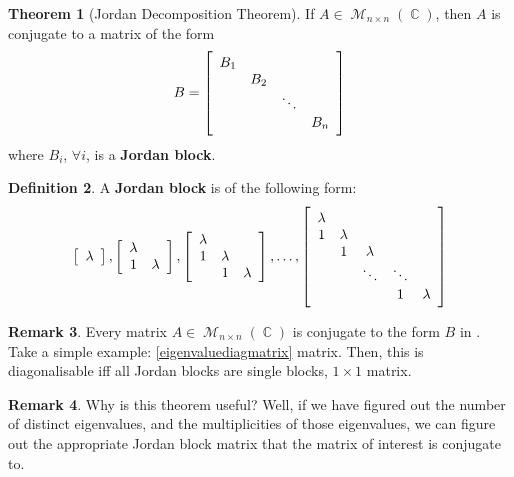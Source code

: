 \documentclass[11pt]{amsart} %
\theoremstyle{definition}
\newtheorem{definition}{Definition}[section]
\newtheorem{theorem}[definition]{Theorem}
\theoremstyle{definition}
\newtheorem{remark}[definition]{Remark}
\DeclareMathOperator{\Com}{\mathbb{C}}
\DeclareMathOperator{\Ma}{\mathcal{M}}
\numberwithin{equation}{section}
\begin{document}
\begin{theorem}[Jordan Decomposition Theorem]
	\label{Jordan Decomposition Theorem}
	If $A \in \Ma_{n \times n} (\Com)$, then $A$ is conjugate to a matrix of the form
	$$ B = \left[ \begin{array}{c c c c }
	B_1 & & & \\
	& B_2 & & \\	
	&  & \ddots & \\	
	&  & & B_n \\			
	\end{array} \right]$$
	where $B_i$, $\forall i$, is a \textbf{Jordan block}.
\end{theorem}

\begin{definition}
	A \textbf{Jordan block} is of the following form:
	$$ \left[\begin{array}{c} \lambda \end{array}\right] ,\left[\begin{array}{c c} \lambda & \\ 1 & \lambda \end{array}\right], \left[\begin{array}{c c c} \lambda &  & \\ 1 & \lambda &  \\ & 1 & \lambda \end{array}\right], \dots, \left[\begin{array}{c c c c c} \lambda &  & & & \\ 1 & \lambda & & &  \\ & 1 & \lambda & & \\ & & \ddots & \ddots & \\ &  & & 1 & \lambda \end{array}\right] $$
\end{definition}

\begin{remark}
	Every matrix $A \in \Ma_{n \times n} (\Com)$ is conjugate to the form $B$ in . Take a simple example: \eqref{eigenvaluediagmatrix} matrix. Then, this is diagonalisable iff all Jordan blocks are single blocks, $1 \times 1$ matrix.
\end{remark}

\begin{remark}
	Why is this theorem useful? Well, if we have figured out the number of distinct eigenvalues, and the multiplicities of those eigenvalues, we can figure out the appropriate Jordan block matrix that the matrix of interest is conjugate to.
\end{remark}
\end{document}
